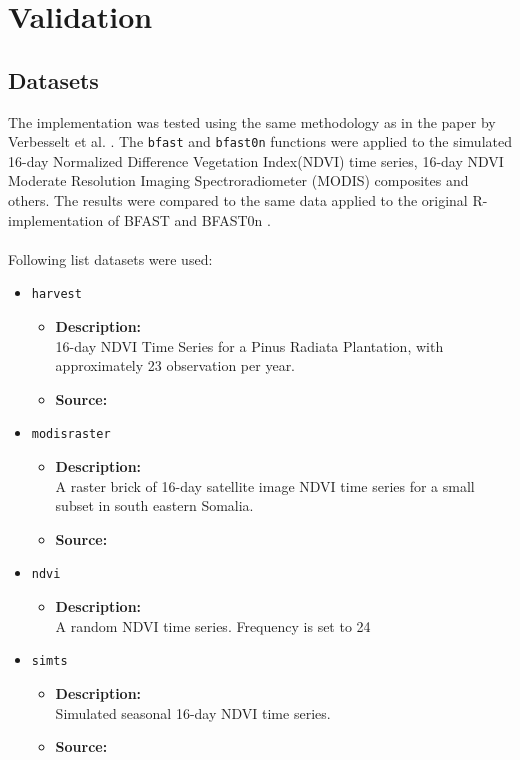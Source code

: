 \documentclass[main.tex]{subfiles}
\begin{document}
\chapter{Validation}
\label{chap:validation}
\section{Datasets}
\label{sec:datasets}
The implementation was tested using the same methodology as in the paper by
Verbesselt et al. \cite{bfast}. The \texttt{bfast} and \texttt{bfast0n}
functions were applied to the simulated 16-day Normalized Difference Vegetation
Index(NDVI) time series, 16-day NDVI Moderate Resolution Imaging
Spectroradiometer (MODIS) composites and others. The results were compared to
the same data applied to the original R-implementation of BFAST and BFAST0n
\cite{bfast-github}.\\\\ 
Following list datasets were used:
\begin{itemize}
\item \texttt{harvest}
  \begin{itemize}
  \item \textbf{Description:}\\
  16-day NDVI Time Series for a Pinus Radiata Plantation, with approximately 23
  observation per year.
  \item \textbf{Source:} \cite{bfast}
  \end{itemize}
\item \texttt{modisraster}
  \begin{itemize}
  \item \textbf{Description:}\\ A raster brick of 16-day satellite image NDVI
    time series for a small subset in south eastern Somalia.
  \item \textbf{Source:} \cite{bfast_monitor1}
  \end{itemize}
\item \texttt{ndvi}
  \begin{itemize}
  \item \textbf{Description:}\\ A random NDVI time series. Frequency is set to 24
  \end{itemize}
\item \texttt{simts}
  \begin{itemize}
  \item \textbf{Description:}\\ Simulated seasonal 16-day NDVI time series.
  \item \textbf{Source:} \cite{bfast}
  \end{itemize}
\end{itemize}

\biblio
\end{document}
